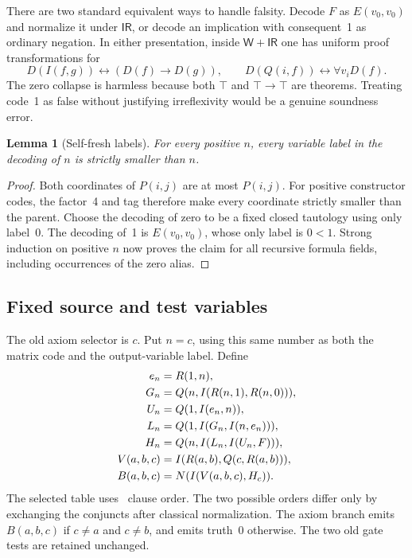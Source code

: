 \documentclass[11pt]{article}
\newcommand{\ThW}{\mathsf W}
\newcommand{\IR}{\mathsf{IR}}
\newtheorem{lemma}[theorem]{Lemma}
\theoremstyle{definition}\newtheorem{definition}[theorem]{Definition}
\begin{document}
There are two standard equivalent ways to handle falsity. Decode $F$ as
$E(v_0,v_0)$ and normalize it under $\IR$, or decode an implication with
consequent~1 as ordinary negation. In either presentation, inside
$\ThW+\IR$ one has uniform proof transformations for
\[
 D(I(f,g))\leftrightarrow(D(f)\to D(g)),\qquad
 D(Q(i,f))\leftrightarrow\forall v_iD(f).
\]
The zero collapse is harmless because both $\top$ and $\top\to\top$ are
theorems. Treating code~1 as false without justifying irreflexivity would
be a genuine soundness error.

\begin{lemma}[Self-fresh labels]\label{lem:fresh}
For every positive $n$, every variable label in the decoding
of $n$ is strictly smaller than $n$.
\end{lemma}
\begin{proof}
Both coordinates of $P(i,j)$ are at most $P(i,j)$. For positive constructor
codes, the factor~4 and tag therefore make every coordinate strictly
smaller than the parent. Choose the decoding of zero to be a fixed closed
tautology using only label~0. The decoding of~1 is $E(v_0,v_0)$, whose
only label is $0<1$. Strong induction on positive $n$ now proves the claim
for all recursive formula fields, including occurrences of the zero alias.
\end{proof}

\subsection{Fixed source and test variables}

The old axiom selector is $c$. Put $n=c$, using this same number as both
the matrix code and the output-variable label. Define
\begin{align}
 e_n&=R(1,n),\nonumber\\
 G_n&=Q(n,I(R(n,1),R(n,0))),\nonumber\\
 U_n&=Q(1,I(e_n,n)),\label{eq:emitter}\\
 L_n&=Q(1,I(G_n,I(n,e_n))),\nonumber\\
 H_n&=Q(n,I(L_n,I(U_n,F))),\nonumber\\
 V(a,b,c)&=I(R(a,b),Q(c,R(a,b))),\nonumber\\
 B(a,b,c)&=N(I(V(a,b,c),H_c)).\nonumber
\end{align}
The selected table uses \ClauseOrder\ clause order. The two possible orders
differ only by exchanging the conjuncts after classical normalization.
The axiom branch emits $B(a,b,c)$ if $c\ne a$ and $c\ne b$, and emits
truth~0 otherwise. The two old gate tests are retained unchanged.
\end{document}
